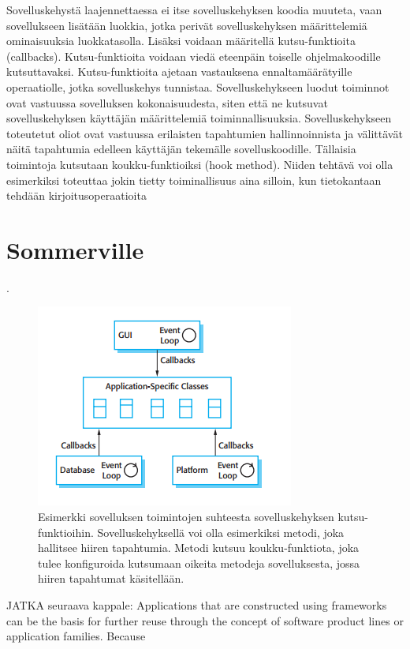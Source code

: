 \documentclass[utf8]{gradu3}
\begin{document}
Sovelluskehystä laajennettaessa ei itse sovelluskehyksen koodia muuteta, vaan sovellukseen lisätään luokkia, jotka perivät sovelluskehyksen määrittelemiä ominaisuuksia luokkatasolla. Lisäksi voidaan määritellä kutsu-funktioita (callbacks). Kutsu-funktioita voidaan viedä eteenpäin toiselle ohjelmakoodille kutsuttavaksi. Kutsu-funktioita ajetaan vastauksena ennaltamäärätyille operaatiolle, jotka sovelluskehys tunnistaa. Sovelluskehykseen luodut toiminnot ovat vastuussa sovelluksen kokonaisuudesta, siten että ne kutsuvat sovelluskehyksen käyttäjän määrittelemiä toiminnallisuuksia. Sovelluskehykseen toteutetut oliot ovat vastuussa erilaisten tapahtumien hallinnoinnista ja välittävät näitä tapahtumia edelleen käyttäjän tekemälle sovelluskoodille.  Tällaisia toimintoja kutsutaan koukku-funktioiksi (hook method). Niiden tehtävä voi olla esimerkiksi toteuttaa jokin tietty toiminallisuus aina silloin, kun tietokantaan tehdään kirjoitusoperaatioita \section[s. 433]{Sommerville}. 

\begin{figure}[h]
\centering
\includegraphics[scale=0.85]{frameworks.PNG}
\caption{Esimerkki sovelluksen toimintojen suhteesta sovelluskehyksen kutsu-funktioihin. Sovelluskehyksellä voi olla esimerkiksi metodi, joka hallitsee hiiren tapahtumia. Metodi kutsuu koukku-funktiota, joka tulee konfiguroida kutsumaan oikeita metodeja sovelluksesta, jossa hiiren tapahtumat käsitellään.   \parencite[s.434]{Sommerville}}
\end{figure}

JATKA seuraava kappale:
Applications that are constructed using frameworks can be the basis for further reuse through the concept of software product lines or application families. Because 
\end{document}

